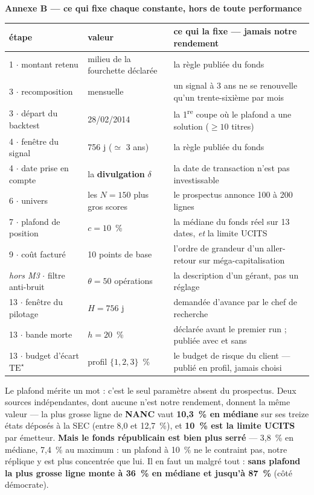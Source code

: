 \documentclass[9pt,a4paper]{extarticle}
\begin{document}
\vspace{0.8mm}
{\color{bleu}\bfseries Annexe B --- ce qui fixe chaque constante, hors de toute performance}\par
\vspace{0.6mm}
{\centering\scriptsize
\begin{tabular}{@{}l l l@{}}
\toprule
\textbf{étape} & \textbf{valeur} & \textbf{ce qui la fixe --- jamais notre rendement} \\
\midrule
1 $\cdot$ montant retenu & milieu de la fourchette déclarée & la règle publiée du fonds \\
3 $\cdot$ recomposition & mensuelle & un signal à 3 ans ne se renouvelle qu'un trente-sixième par mois \\
3 $\cdot$ départ du backtest & 28/02/2014 & la 1\textsuperscript{re} coupe où le plafond a une solution ($\ge10$ titres) \\
4 $\cdot$ fenêtre du signal & 756 j ($\simeq$ 3 ans) & la règle publiée du fonds \\
4 $\cdot$ date prise en compte & la \textbf{divulgation} $\delta$ & la date de transaction n'est pas investissable \\
6 $\cdot$ univers & les $N = 150$ plus gros scores & le prospectus annonce 100 à 200 lignes \\
7 $\cdot$ plafond de position & $c = 10$~\% & la médiane du fonds réel sur 13 dates, \emph{et} la limite UCITS \\
9 $\cdot$ coût facturé & 10 points de base & l'ordre de grandeur d'un aller-retour sur méga-capitalisation \\
\emph{hors M3} $\cdot$ filtre anti-bruit & $\theta = 50$ opérations & la description d'un gérant, pas un réglage \\
13 $\cdot$ fenêtre du pilotage & $H = 756$ j & demandée d'avance par le chef de recherche \\
13 $\cdot$ bande morte & $h = 20$~\% & déclarée avant le premier run ; publiée avec et sans \\
13 $\cdot$ budget d'écart $\mathrm{TE}^\star$ & profil $\{1, 2, 3\}$~\% & le budget de risque du client --- publié en profil, jamais choisi \\
\bottomrule
\end{tabular}\par}
\vspace{0.4mm}
{\footnotesize\color{grisf} Le plafond mérite un mot : c'est le seul paramètre absent du prospectus. Deux
sources indépendantes, dont aucune n'est notre rendement, donnent la même valeur --- la plus grosse ligne de
\textbf{NANC} vaut \textbf{10,3~\% en médiane} sur ses treize états déposés à la SEC (entre 8,0 et 12,7~\%),
et \textbf{10~\% est la limite UCITS} par émetteur. \textbf{Mais le fonds républicain est bien plus serré}
--- 3,8~\% en médiane, 7,4~\% au maximum : un plafond à 10~\% ne le contraint pas, notre réplique y est plus
concentrée que lui. Il en faut un malgré tout : \textbf{sans plafond la plus grosse ligne monte à 36~\% en
médiane et jusqu'à 87~\%} (côté démocrate).}\par
\end{document}
